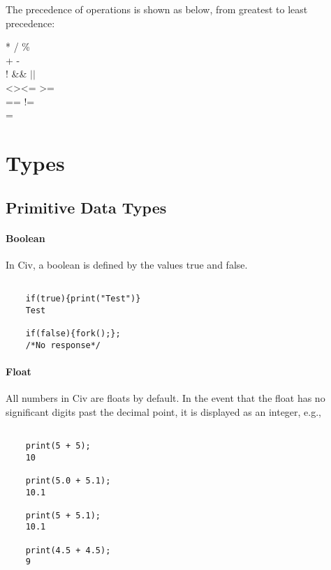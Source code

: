 \documentclass[a4paper]{article}
\begin{document}
The precedence of operations is shown as below, from greatest to least precedence: 
\begin{center}

\selectfont
* / \% \\
+ - \\ 
! \&\& $||$ \\
\textless \quad  \textgreater \quad \textless= \quad \textgreater= \\
== \quad !=\\
=\\ 
\end{center}


\section{Types}

\subsection{Primitive Data Types}
\paragraph{Boolean}
In Civ, a boolean is defined by the values {\selectfont true} and {\selectfont false}. 

{\selectfont
\begin{lstlisting} 
    
	if(true){print("Test")}
	Test
        
	if(false){fork();};
	/*No response*/

\end{lstlisting}
}

\paragraph{Float}
All numbers in Civ are floats by default. In the event that the float has no significant digits past the decimal point, it is displayed as an integer, e.g.,

{\selectfont
\begin{lstlisting} 

	print(5 + 5);
	10
    
	print(5.0 + 5.1);
	10.1
    
	print(5 + 5.1);
	10.1
    
	print(4.5 + 4.5);
	9

\end{lstlisting}
}
\end{document}
